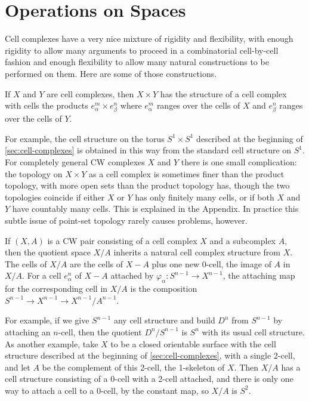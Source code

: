 \section{Operations on Spaces}
\label{sec:operations-on-spaces}

Cell complexes have a very nice mixture of rigidity and flexibility, with enough
rigidity to allow many arguments to proceed in a combinatorial cell-by-cell fashion and
enough flexibility to allow many natural constructions to be performed on them. Here
are some of those constructions.

\begin{definition}
\label{def:product-cw-structure}
If $X$ and $Y$ are cell complexes, then $X \times Y$ has the structure of a cell complex
with cells the products $e_\alpha^m \times e_\beta^n$ where $e_\alpha^m$ ranges over the cells of $X$ and
$e_\beta^n$ ranges over the cells of $Y$.
\end{definition}

For example, the cell structure on the torus $S^1 \times S^1$ described at the beginning
of \cref{sec:cell-complexes} is obtained in this way from the standard cell structure on
$S^1$. For completely general CW complexes $X$ and $Y$ there is one small complication:
the topology on $X \times Y$ as a cell complex is sometimes finer than the product
topology, with more open sets than the product topology has, though the two
topologies coincide if either $X$ or $Y$ has only finitely many cells, or if both $X$ and
$Y$ have countably many cells. This is explained in the Appendix. In practice this subtle
issue of point-set topology rarely causes problems, however.

\begin{definition}
\label{def:quotient-cw-structure}
If $(X,A)$ is a CW pair consisting of a cell complex $X$ and a subcomplex $A$, then
the quotient space $X/A$ inherits a natural cell complex structure from $X$. The cells
of $X/A$ are the cells of $X - A$ plus one new 0-cell, the image of $A$ in $X/A$. For a
cell $e_\alpha^n$ of $X - A$ attached by $\varphi_\alpha : S^{n-1} \to X^{n-1}$, the attaching map for the
corresponding cell in $X/A$ is the composition $S^{n-1} \to X^{n-1} \to X^{n-1}/A^{n-1}$.
\end{definition}

For example, if we give $S^{n-1}$ any cell structure and build $D^n$ from $S^{n-1}$ by
attaching an $n$-cell, then the quotient $D^n/S^{n-1}$ is $S^n$ with its usual cell structure.
As another example, take $X$ to be a closed orientable surface with the cell structure
described at the beginning of \cref{sec:cell-complexes}, with a single 2-cell, and let $A$
be the complement of this 2-cell, the 1-skeleton of $X$. Then $X/A$ has a cell structure
consisting of a 0-cell with a 2-cell attached, and there is only one way to attach a cell
to a 0-cell, by the constant map, so $X/A$ is $S^2$.

